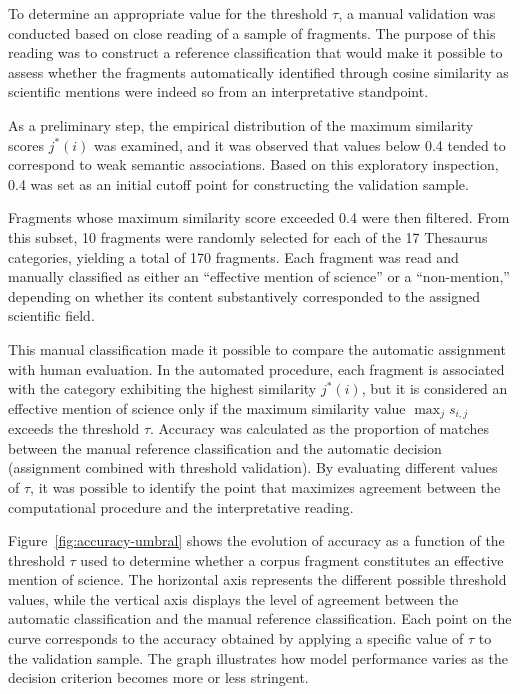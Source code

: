 \documentclass[11pt,a4paper]{article}
\begin{document}
To determine an appropriate value for the threshold $\tau$, a manual validation was conducted based on close reading of a sample of fragments. The purpose of this reading was to construct a reference classification that would make it possible to assess whether the fragments automatically identified through cosine similarity as scientific mentions were indeed so from an interpretative standpoint.

As a preliminary step, the empirical distribution of the maximum similarity scores $j^*(i)$ was examined, and it was observed that values below 0.4 tended to correspond to weak semantic associations. Based on this exploratory inspection, 0.4 was set as an initial cutoff point for constructing the validation sample.

Fragments whose maximum similarity score exceeded 0.4 were then filtered. From this subset, 10 fragments were randomly selected for each of the 17 Thesaurus categories, yielding a total of 170 fragments. Each fragment was read and manually classified as either an “effective mention of science” or a “non-mention,” depending on whether its content substantively corresponded to the assigned scientific field.

This manual classification made it possible to compare the automatic assignment with human evaluation. In the automated procedure, each fragment is associated with the category exhibiting the highest similarity $j^*(i)$, but it is considered an effective mention of science only if the maximum similarity value $\max_j s_{i,j}$ exceeds the threshold $\tau$. Accuracy was calculated as the proportion of matches between the manual reference classification and the automatic decision (assignment combined with threshold validation). By evaluating different values of $\tau$, it was possible to identify the point that maximizes agreement between the computational procedure and the interpretative reading.

Figure~\ref{fig:accuracy-umbral} shows the evolution of accuracy as a function of the threshold $\tau$ used to determine whether a corpus fragment constitutes an effective mention of science. The horizontal axis represents the different possible threshold values, while the vertical axis displays the level of agreement between the automatic classification and the manual reference classification. Each point on the curve corresponds to the accuracy obtained by applying a specific value of $\tau$ to the validation sample. The graph illustrates how model performance varies as the decision criterion becomes more or less stringent.
\end{document}
